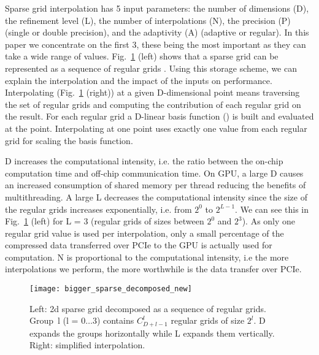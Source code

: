 Sparse grid interpolation has 5 input parameters: the number of dimensions (D), the refinement level (L), the number of interpolations (N), the precision (P) (single or double precision), and the adaptivity (A) (adaptive or regular). In this paper we concentrate on the first 3, these being the most important as they can take a wide range of values. Fig.~\ref{fig:bigger_sparse_decomposed} (left) shows that a sparse grid can be represented as a sequence of regular grids \cite{murarasu2011}. 
Using this storage scheme, we can explain the interpolation and the impact of the inputs on performance. Interpolating (Fig.~\ref{fig:bigger_sparse_decomposed} (right)) at a given D-dimensional point means traversing the set of regular grids and computing the contribution of each regular grid on the result. For each regular grid a D-linear basis function () is built and evaluated at the point. Interpolating    at one point uses exactly one value from each regular grid for scaling the basis function. 

D increases the computational intensity, i.e. the ratio between the on-chip computation time and off-chip communication time. On GPU, a large D causes an increased consumption of shared memory per thread reducing the benefits of multithreading. A large L decreases the computational intensity since the size of the regular grids increases exponentially, i.e. from $2^0$ to $2^{L-1}$. We can see this in Fig.~\ref{fig:bigger_sparse_decomposed} (left) for L = 3 (regular grids of sizes between $2^0$ and $2^3$). As only one regular grid value is used per interpolation, only a small percentage of the compressed data transferred over PCIe to the GPU is actually used for computation. N is proportional to the computational intensity, i.e the more interpolations we perform, the more worthwhile is the data transfer over PCIe.

\begin{figure}[tbp]
  \centering
  \texttt{[image: bigger\_sparse\_decomposed\_new]}
  \caption{Left: 2d sparse grid decomposed as a sequence of regular grids. Group~l (l = $0 \dots 3$) contains $C_{D+l-1}^l$ regular grids of size $2^l$. D expands the groups horizontally while L expands them vertically. Right: simplified interpolation.}
  \label{fig:bigger_sparse_decomposed}
\end{figure}

